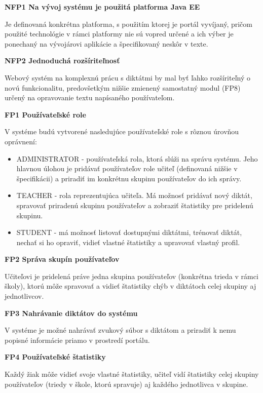 \documentclass[12pt,oneside]{fithesis2}
\begin{document}
\bigskip
     \textbf{NFP1 Na vývoj systému je použitá platforma Java EE}
     \par Je definovaná konkrétna platforma, s použitím ktorej je portál vyvíjaný, pričom použité technológie v rámci platformy nie sú vopred určené a ich výber je ponechaný na vývojárovi aplikácie a špecifikovaný neskôr v texte.
     
\bigskip
     \textbf{NFP2 Jednoduchá rozšíriteľnosť}      		
	\par Webový systém na komplexnú prácu s diktátmi by mal byť ľahko rozšíriteľný o novú funkcionalitu, predovšetkým nižšie zmienený samostatný modul (FP8) určený na opravovanie textu napísaného používateľom.
	
\bigskip
     \textbf{FP1 Používateľské role}  
     \par V systéme budú vytvorené nasledujúce používateľské role s rôznou úrovňou oprávnení:
\begin{itemize}
	\item ADMINISTRATOR - používateľská rola, ktorá slúži na správu systému. Jeho hlavnou úlohou je pridávať používateľov role učiteľ (definovaná nižšie v špecifikácii) a priradiť im konkrétnu skupinu používateľov do ich správy.
	\item TEACHER - rola reprezentujúca učiteľa. Má možnosť pridávať nový diktát, spravovať priradenú skupinu používateľov a zobraziť štatistiky pre pridelenú skupinu. 
	\item STUDENT - má možnosť listovať dostupnými diktátmi, trénovať diktát, nechať si ho opraviť, vidieť vlastné štatistiky a upravovať vlastný profil.
\end{itemize}

\bigskip
     \textbf{FP2 Správa skupín používateľov}  
     \par Učiteľovi je pridelená práve jedna skupina používateľov (konkrétna trieda v rámci školy), ktorú môže spravovať a vidieť štatistiky chýb v diktátoch celej skupiny aj jednotlivcov.
     
\bigskip
     \textbf{FP3 Nahrávanie diktátov do systému}  
     \par V systéme je možné nahrávať zvukový súbor s diktátom a priradiť k nemu popisné informácie priamo v prostredí portálu.     

\bigskip
     \textbf{FP4 Používateľské štatistiky}  
     \par Každý žiak môže vidieť svoje vlastné štatistiky, učiteľ vidí štatistiky celej skupiny používateľov (triedy v škole, ktorú spravuje) aj každého jednotlivca v skupine.
     
\end{document}
